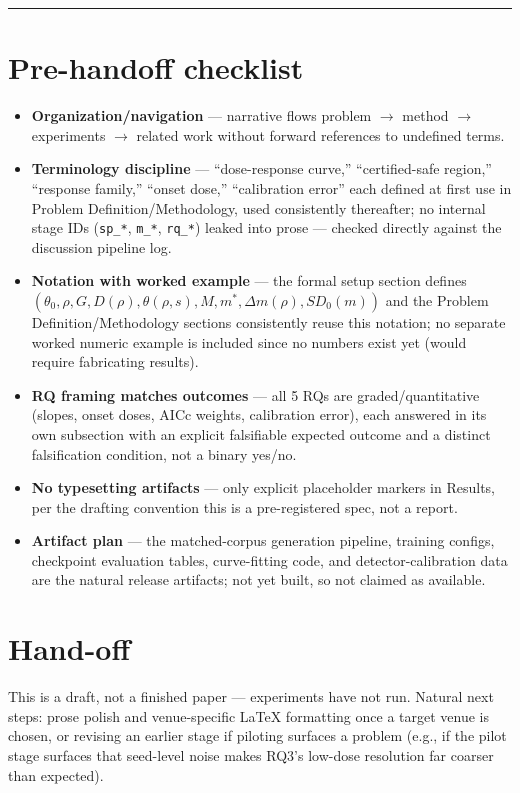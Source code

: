 \documentclass[11pt]{article}
\begin{document}
\vspace{1em}
\hrule
\vspace{1em}

\section*{Pre-handoff checklist}
\begin{itemize}[leftmargin=1.4em]
\item \textbf{Organization/navigation} --- narrative flows problem $\to$ method $\to$ experiments $\to$ related work without forward references to undefined terms.
\item \textbf{Terminology discipline} --- ``dose-response curve,'' ``certified-safe region,'' ``response family,'' ``onset dose,'' ``calibration error'' each defined at first use in Problem Definition/Methodology, used consistently thereafter; no internal stage IDs (\texttt{sp\_*}, \texttt{m\_*}, \texttt{rq\_*}) leaked into prose --- checked directly against the discussion pipeline log.
\item \textbf{Notation with worked example} --- the formal setup section defines $(\theta_0, \rho, G, D(\rho), \theta(\rho,s), M, m^*, \Delta m(\rho), SD_0(m))$ and the Problem Definition/Methodology sections consistently reuse this notation; no separate worked numeric example is included since no numbers exist yet (would require fabricating results).
\item \textbf{RQ framing matches outcomes} --- all 5 RQs are graded/quantitative (slopes, onset doses, AICc weights, calibration error), each answered in its own subsection with an explicit falsifiable expected outcome and a distinct falsification condition, not a binary yes/no.
\item \textbf{No typesetting artifacts} --- only explicit placeholder markers in Results, per the drafting convention this is a pre-registered spec, not a report.
\item \textbf{Artifact plan} --- the matched-corpus generation pipeline, training configs, checkpoint evaluation tables, curve-fitting code, and detector-calibration data are the natural release artifacts; not yet built, so not claimed as available.
\end{itemize}

\section*{Hand-off}
This is a draft, not a finished paper --- experiments have not run. Natural next steps: prose polish and venue-specific LaTeX formatting once a target venue is chosen, or revising an earlier stage if piloting surfaces a problem (e.g., if the pilot stage surfaces that seed-level noise makes RQ3's low-dose resolution far coarser than expected).



\end{document}
